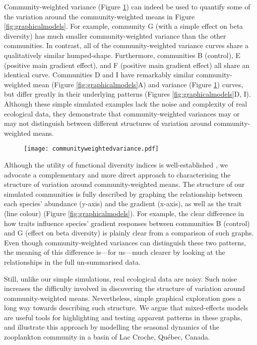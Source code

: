 \documentclass[12pt]{ecology}
\begin{document}
Community-weighted variance (Figure \ref{fig:cwvar}) can indeed be used to quantify some of the variation around the community-weighted means in Figure \ref{fig:graphicalmodels}.  For example, community G (with a simple effect on beta diversity) has much smaller community-weighted variance than the other communities.  In contrast, all of the community-weighted variance curves share a qualitatively similar humped-shape.  Furthermore, communities B (control), E (positive main gradient effect), and F (positive main gradient effect) all share an identical curve.  Communities D and I have remarkably similar community-weighted mean (Figure \ref{fig:graphicalmodels}A) and variance (Figure \ref{fig:cwvar}) curves, but differ greatly in their underlying patterns (Figures \ref{fig:graphicalmodels}D, I).  Although these simple simulated examples lack the noise and complexity of real ecological data, they demonstrate that community-weighted variances may or may not distinguish between different structures of variation around community-weighted means.
\begin{figure}
\caption[Changes in community-weighted variance along the gradient in Figure \ref{fig:graphicalmodels}.  Each line corresponds to the lettered communities in that figure.]{}
\texttt{[image: communityweightedvariance.pdf]}
\label{fig:cwvar}
\end{figure}

Although the utility of functional diversity indices is well-established \citetext{e.g. \citealp{DiazEtAl2007, WalkerEtAl2008, SpasojevicAndSuding2011}}, we advocate a complementary and more direct approach to characterising the structure of variation around community-weighted means.  The structure of our simulated communities is fully described by graphing the relationship between each species' abundance (y-axis) and the gradient (x-axis), as well as the trait (line colour) (Figure \ref{fig:graphicalmodels}).  For example, the clear difference in how traits influence species' gradient responses between communities B (control) and G (effect on beta diversity) is plainly clear from a comparison of such graphs.  Even though community-weighted variances can distinguish these two patterns, the meaning of this difference is---for us---much clearer by looking at the relationships in the full un-summarised data.

Still, unlike our simple simulations, real ecological data are noisy.  Such noise increases the difficulty involved in discovering the structure of variation around community-weighted means.  Nevertheless, simple graphical exploration goes a long way towards describing such structure.  We argue that mixed-effects models are useful tools for highlighting and testing apparent patterns in these graphs, and illustrate this approach by modelling the seasonal dynamics of the zooplankton community in a basin of Lac Croche, Qu\'{e}bec, Canada.
\end{document}
